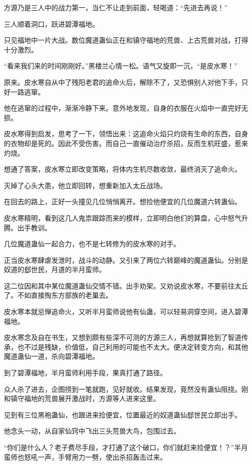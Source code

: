 \begin{this_body}
方源乃是三人中的战力第一，当仁不让走到前面，轻喝道：“先进去再说！”

三人顺着洞口，跃进碧潭福地。

只见福地中一片大战。数位魔道蛊仙正在和镇守福地的荒兽、上古荒兽对战，打得十分激烈。

“看来我们来的时间刚刚好。”黑楼兰心情一松。语气又旋即一沉，“是皮水寒！”

原来。皮水寒自从中了残阳老君的追命火后，解除不了，又恐惧别人对他下手，只好一路逃窜。

他在逃窜的过程中，渐渐冷静下来。意外地发现，自身的衣服在火焰中一直完好无损。

皮水寒得到启发，思考了一下，领悟出来：这追命火焰只灼烧有生命的东西，自身的衣物却是死的。因此不受伤害。而自己一直催动治疗杀招，反而生机旺盛，惹来灼烧。

想通了答案，皮水寒立即改变策略，将体内生机尽数收敛，最终消灭了追命火。

灭掉了心头大患，他立即回转，想重新加入太丘战场。

在回去的路上，正好一头撞见几位悄悄离开。想捡他便宜的几位魔道六转蛊仙。

皮水寒精明，看到这几人鬼祟跟踪而来的模样，立即明白他们的算盘，心中怒气升腾。出手教训。

几位魔道蛊仙一起合力，也不是七转修为的皮水寒的对手。

正当皮水寒肆虐发泄时，战斗的动静。又引来了两位六转巅峰的魔道蛊仙。分别是奴道的郄世民，月道的半月蛮师。

这二位因和其中某位魔道蛊仙交情不错。出手劝架。又劝说皮水寒，不要前往太丘了。不如直接掏东方部族的老巢去。

皮水寒本就忌惮追命火，又听半月蛮师说他有仙蛊，可以轻易洞穿空间，进入碧潭福地。

皮水寒念及自在书生，又想到颇有些深不可测的方源三人，再想就算抢到了智道传承，也不过是残缺，价值低，自己利用的可能也不太大。便决定转变方向，和其他魔道蛊仙一道，杀向碧潭福地。

到了碧潭福地，半月蛮师利用手段，果真打通了路径。

众人杀了进去，企图捞到一笔就跑，见好就收。结果发现，竟然没有蛊仙阻挠。刚和镇守福地的荒兽展开激战时，方源等人进来这里。

见到有三位黑袍蛊仙，也跟进来捡便宜，位置最近的奴道蛊仙郄世民立即出手。

他念头一动，从自家仙窍中飞出三头荒兽大鸟，包围过去。

“你们是什么人？老子费尽手段，才打通了这个破口，你们就赶来捡便宜！？”半月蛮师也怒吼一声，手臂用力一劈，使出杀招轰击过来。


\end{this_body}
